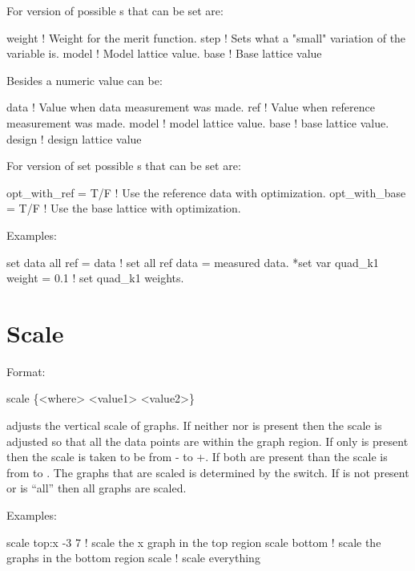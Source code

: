 For  version of  possible 
s that can be set are:
\begin{example}
  weight     ! Weight for the merit function.
  step       ! Sets what a "small" variation of the variable is.
  model      ! Model lattice value.
  base       ! Base lattice value
\end{example}
Besides a numeric value  can be:
\begin{example}
  data        ! Value when data measurement was made.
  ref         ! Value when reference measurement was made.
  model       ! model lattice value.
  base        ! base lattice value.
  design      ! design lattice value
\end{example}

For  version of set possible 
s that can be set are:
\begin{example}
  opt\_with\_ref  = T/F ! Use the reference data with optimization.
  opt\_with\_base = T/F ! Use the base lattice with optimization.
\end{example}

Examples:
\begin{example}
  set data all ref = data       ! set all ref data = measured data.
  *set var quad\_k1 weight = 0.1 ! set quad\_k1 weights. 
\end{example}

\section{Scale}
\label{s:scale}

Format:
\begin{example}
  scale \{<where> <value1> <value2>\}
\end{example}

\vskip 0.2in  adjusts the vertical scale of graphs. If
neither  nor  is present then the scale is
adjusted so that all the data points are within the graph region.  If
only  is present then the scale is taken to be from
- to +. If both are present than the scale
is from  to .  The graphs that are scaled
is determined by the  switch. If  is not
present  or  is ``all'' then all graphs are scaled. 

Examples:
\begin{example}
  scale top:x -3  7  ! scale the x graph in the top region
  scale bottom       ! scale the graphs in the bottom region
  scale              ! scale everything
\end{example}


